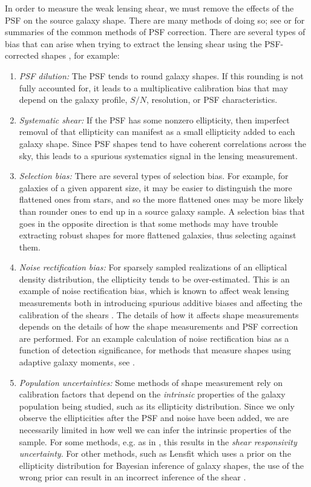 \documentclass[twocolumn,useAMS,usenatbib]{mn2e}
\begin{document}
In order to measure the weak lensing shear, we must remove the effects
of the PSF on the source galaxy shape.  There are many methods
of doing so; see \cite{2007MNRAS.376...13M} or
\cite{2010MNRAS.405.2044B} for summaries of the 
common methods of PSF correction.  There are several types of bias
that can arise when trying to extract the lensing shear using the
PSF-corrected shapes \citep{2004MNRAS.353..529H}, for example:
\begin{enumerate}
\item {\em PSF dilution:} The PSF tends to round galaxy
  shapes.  If this rounding is not fully accounted for, it leads to a
  multiplicative calibration bias that may depend on the galaxy
  profile, $S/N$, resolution, or PSF characteristics.
\item {\em Systematic shear:} If the PSF has some nonzero ellipticity, then
  imperfect removal of that ellipticity can manifest as a small
  ellipticity added to each galaxy shape.  Since PSF shapes tend to
  have coherent correlations across the sky, this leads to a spurious
  systematics signal in the lensing measurement.
\item {\em Selection bias:} There are several types of selection
  bias.  For example, for galaxies of a given apparent size, it may be
  easier to distinguish the more flattened ones from stars, and so the
  more flattened ones may be more likely than rounder ones to end up
  in a source galaxy sample.  A selection bias that goes in the
  opposite direction is that some methods may have trouble
  extracting robust shapes for more flattened galaxies, thus selecting
  against them.  
\item {\em Noise rectification bias:} For sparsely sampled
  realizations of an elliptical density distribution, the ellipticity
  tends to be over-estimated.  This is an example of noise
  rectification bias, which is known to affect weak lensing
  measurements both in introducing spurious additive biases and
  affecting the calibration of the shears
  \citep{2000ApJ...537..555K,2002AJ....123..583B,2004MNRAS.353..529H}.
  The details of how it affects shape measurements depends on the
  details of how the shape measurements and PSF correction are
  performed.  For an example calculation of noise rectification bias
  as a function of detection significance, for methods that measure shapes using adaptive galaxy
  moments, see \cite{2004MNRAS.353..529H}.
\item {\em Population uncertainties:} Some methods of shape
  measurement rely on calibration factors that depend on the
  {\em intrinsic} properties of the galaxy population being studied,
  such as its ellipticity distribution.  Since we only observe the
  ellipticities after the PSF and noise have been added, we are
  necessarily limited in how well we can infer the intrinsic
  properties of the sample.  For some methods, e.g. as in
  \cite{2004MNRAS.353..529H}, this results in the {\em shear
    responsivity uncertainty}.  For other methods, such as Lensfit
  which uses a prior on the ellipticity distribution for Bayesian
  inference of galaxy shapes,
  the use of the wrong prior can result in an incorrect inference of
  the shear \citep{2007MNRAS.382..315M}.
\end{enumerate}
\end{document}
